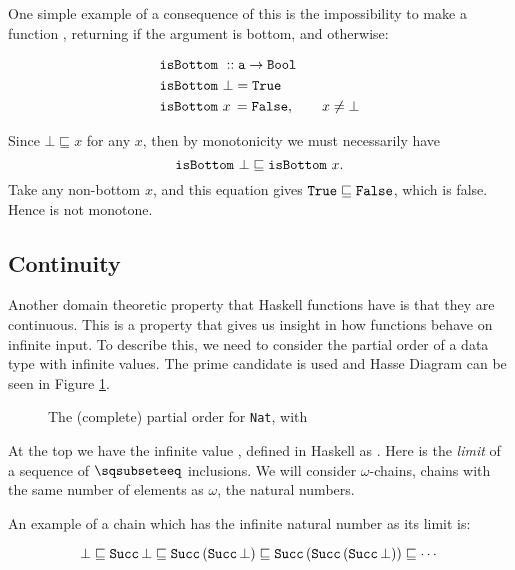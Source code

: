 One simple example of a consequence of this is the impossibility to
make a function , returning  if the
argument is bottom, and  otherwise:

\begin{align*}
& \texttt{isBottom} \,\, :: \texttt{a} \rightarrow \texttt{Bool} \\
& \texttt{isBottom} \,\, \bot = \texttt{True} \\
& \texttt{isBottom} \,\, x \, = \texttt{False}, \qquad x \neq \bot
\end{align*}

\noindent
Since $\bot \sqsubseteq x$ for any $x$, then by monotonicity we must
necessarily have
$$\texttt{isBottom} \,\, \bot \sqsubseteq \texttt{isBottom} \,\, x.$$
Take any non-bottom $x$, and this equation gives
$\texttt{True} \sqsubseteq \texttt{False}$, which is false. Hence
 is not monotone.

\subsection{Continuity}
Another domain theoretic property that Haskell functions have is that
they are continuous. This is a property that gives us insight in how
functions behave on infinite input.  To describe this, we need to
consider the partial order of a data type with infinite values. The
prime candidate  is used and Hasse
Diagram can be seen in Figure \ref{fig:natcpo}.

\begin{figure}[h]
\centering

\caption{
    The (complete) partial order for \texttt{Nat}, with 
    \label{fig:natcpo}
}
\end{figure}

At the top we have the infinite value , defined in Haskell as
. Here  is the \emph{limit} of a sequence
of $\sqsubseteeq$ inclusions. We will consider $\omega$-chains, chains with the same number of elements as
$\omega$, the natural numbers.

An example of a chain which has the infinite natural number 
as its limit is:

\begin{equation*}
\bot \sqsubseteq
\texttt{Succ} \, \bot \sqsubseteq
\texttt{Succ} \, (\texttt{Succ} \, \bot) \sqsubseteq
\texttt{Succ} \, (\texttt{Succ} \, (\texttt{Succ} \, \bot)) \sqsubseteq
\cdots
\end{equation*}


